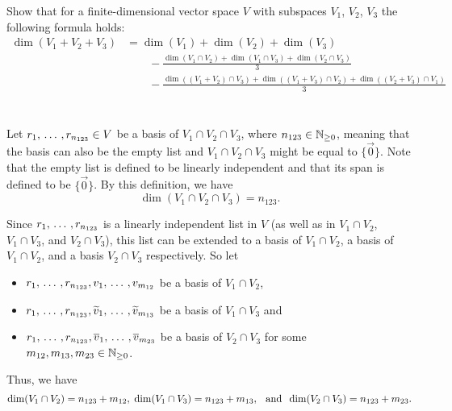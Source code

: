 \begin{xrcs}
  Show that for a finite-dimensional vector space $V$ with subspaces $V_1$, $V_2$, $V_3$ the following formula holds:
  \begin{equation}
  \begin{aligned}
    \dim (V_1 + V_2 + V_3)  &= \dim (V_1) + \dim (V_2) + \dim (V_3) \\
    & \qquad - \frac{\dim (V_1 \cap V_2) + \dim (V_1 \cap V_3) + \dim (V_2 \cap V_3)}{3} \\
    & \qquad - \frac{ \dim \left(  (V_1 + V_2) \cap V_3 \right) + \dim \left( (V_1 + V_3) \cap V_2 \right)+ \dim \left( (V_2 + V_3) \cap V_1 \right) }{3} \\
  \end{aligned}
\end{equation}

 \\
Let $r_1, {\, \ldots \,\,}, r_{n_{123}} \in V$ be a basis of $V_1 \cap V_2 \cap V_3$, where $n_{123} \in \mathbb{N}_{\geq 0}$, meaning that the basis can also be the empty list and $V_1 \cap V_2 \cap V_3$ might be equal to $\{\vec 0\}$. Note that the empty list is defined to be linearly independent and that its span is defined to be $\{\vec 0\}$. By this definition, we have
\begin{equation}
  \label{eq: dim for V_1 cap V_2 cap V_3}
  \dim (V_1 \cap V_2 \cap V_3) = n_{123}.
\end{equation}

Since $r_1, {\, \ldots \,\,}, r_{n_{123}}$ is a linearly independent list in $V$ (as well as in $V_1 \cap V_2$, $V_1 \cap V_3$, and $V_2 \cap V_3$), this list can be extended to a basis of $V_1 \cap V_2$, a basis of $V_1 \cap V_2$, and a basis $V_2 \cap V_3$ respectively. So let
\begin{itemize}
  \item $r_1, {\, \ldots \,\,}, r_{n_{123}}, v_1, {\, \ldots \,\,}, v_{m_{12}}$ be a basis of $V_1 \cap V_2$,
  \item $r_1, {\, \ldots \,\,}, r_{n_{123}}, \widetilde{v}_1, {\, \ldots \,\,}, \widetilde{v}_{m_{13}}$ be a basis of $V_1 \cap V_3$ and
  \item $r_1, {\, \ldots \,\,}, r_{n_{123}}, \overline{v}_1, {\, \ldots \,\,}, \overline{v}_{m_{23}}$ be a basis of $V_2 \cap V_3$ for some $m_{12}, m_{13}, m_{23} \in \mathbb{N}_{\geq 0}$.
\end{itemize}

Thus, we have
\begin{equation}
  \label{eq: dim for V_1 cap V_2, V_1 cap V_3, V_2 cap V_3}
  \dim (V_1 \cap V_2) = n_{123} + m_{12}, \; \dim (V_1 \cap V_3) = n_{123} + m_{13}, \;\;\, \text{and}\;\; \dim (V_2 \cap V_3) = n_{123} + m_{23}.
\end{equation}


\end{xrcs}
